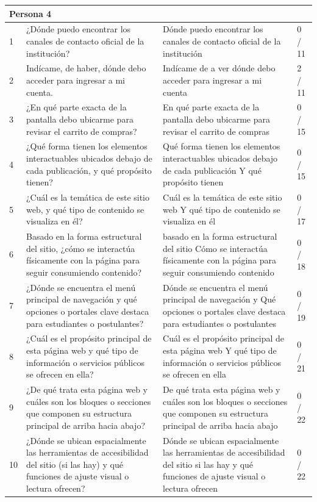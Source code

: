 \begin{longtable}{|p{0.5cm}|p{5.7cm}|p{5.7cm}|p{1.5cm}|}
    \multicolumn{4}{|l|}{\textbf{Persona 4}} \\
    \hline
    1 & ¿Dónde puedo encontrar los canales de contacto oficial de la institución? & Dónde puedo encontrar los canales de contacto oficial de la institución & 0 / 11 \\
    \hline
    2 & Indícame, de haber, dónde debo acceder para ingresar a mi cuenta. & Indícame de a ver dónde debo acceder para ingresar a mi cuenta & 2 / 11 \\
    \hline
    3 & ¿En qué parte exacta de la pantalla debo ubicarme para revisar el carrito de compras? & En qué parte exacta de la pantalla debo ubicarme para revisar el carrito de compras & 0 / 15 \\
    \hline
    4 & ¿Qué forma tienen los elementos interactuables ubicados debajo de cada publicación, y qué propósito tienen? & Qué forma tienen los elementos interactuables ubicados debajo de cada publicación Y qué propósito tienen & 0 / 15 \\
    \hline
    5 & ¿Cuál es la temática de este sitio web, y qué tipo de contenido se visualiza en él? & Cuál es la temática de este sitio web Y qué tipo de contenido se visualiza en él & 0 / 17 \\
    \hline
    6 & Basado en la forma estructural del sitio, ¿cómo se interactúa físicamente con la página para seguir consumiendo contenido? & basado en la forma estructural del sitio Cómo se interactúa físicamente con la página para seguir consumiendo contenido & 0 / 18 \\
    \hline
    7 & ¿Dónde se encuentra el menú principal de navegación y qué opciones o portales clave destaca para estudiantes o postulantes? & Dónde se encuentra el menú principal de navegación y Qué opciones o portales clave destaca para estudiantes o postulantes & 0 / 19 \\
    \hline
    8 & ¿Cuál es el propósito principal de esta página web y qué tipo de información o servicios públicos se ofrecen en ella? & Cuál es el propósito principal de esta página web Y qué tipo de información o servicios públicos se ofrecen en ella & 0 / 21 \\
    \hline
    9 & ¿De qué trata esta página web y cuáles son los bloques o secciones que componen su estructura principal de arriba hacia abajo? & De qué trata esta página web y cuáles son los bloques o secciones que componen su estructura principal de arriba hacia abajo & 0 / 22 \\
    \hline
    10 & ¿Dónde se ubican espacialmente las herramientas de accesibilidad del sitio (si las hay) y qué funciones de ajuste visual o lectura ofrecen? & Dónde se ubican espacialmente las herramientas de accesibilidad del sitio si las hay y qué funciones de ajuste visual o lectura ofrecen & 0 / 22 \\
    \hline


\end{longtable}
